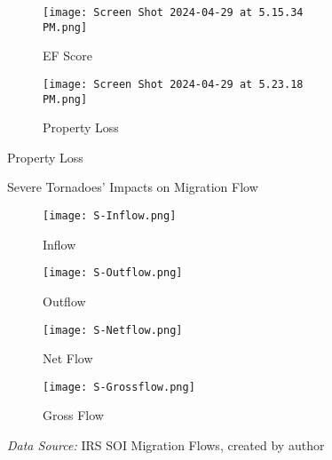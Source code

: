 \documentclass[letterpaper]{article}
\begin{document}

\begin{figure}[H]
    \centering
     \caption{2020 Tornadoes in the U.S.}
    \begin{subfigure}{\textwidth}
        \centering
       
        \texttt{[image: Screen Shot 2024-04-29 at 5.15.34 PM.png]}
        \caption{EF Score}
        \label{subfig:locations}
    \end{subfigure}
    
    \vspace{1cm} %
    
    \begin{subfigure}{\textwidth}
        \centering
        \texttt{[image: Screen Shot 2024-04-29 at 5.23.18 PM.png]}
        \caption{Property Loss}
        \label{subfig:property_loss}
    \end{subfigure}
    
    
    \label{fig:tornadoes_2020}
\end{figure}


\begin{figure}[H]
    \centering
    
    \caption{Severe Tornadoes' Impacts on Migration Flow}
    \label{fig4.1}
    \begin{subfigure}{0.5\textwidth}
        \centering
        \texttt{[image: S-Inflow.png]}
        \caption{Inflow}
        \label{22a}
    \end{subfigure}%
    \hfill
    \begin{subfigure}{0.5\textwidth}
        \centering
        \texttt{[image: S-Outflow.png]}
        \caption{Outflow}
        \label{22b}
    \end{subfigure}
    
    \begin{subfigure}{0.5\textwidth}
        \centering
        \texttt{[image: S-Netflow.png]}
        \caption{Net Flow}
        \label{22c}
    \end{subfigure}%
    \hfill
    \begin{subfigure}{0.5\textwidth}
        \centering
        \texttt{[image: S-Grossflow.png]}
        \caption{Gross Flow}
        \label{22d}
    \end{subfigure}
    
    \label{USflows}
    \caption*{\textit{Data Source:} IRS SOI Migration Flows, created by author}
\end{figure}
\end{document}
